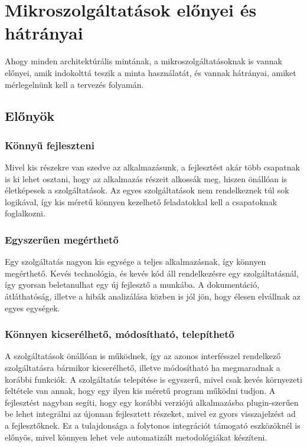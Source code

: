 \documentclass[11pt,magyar,a4paper,twoside,]{report}
\begin{document}
\section{Mikroszolgáltatások előnyei és
hátrányai}\label{mikroszolguxe1ltatuxe1sok-elux151nyei-uxe9s-huxe1truxe1nyai}

Ahogy minden architektúrális mintának, a mikroszolgáltatásoknak is
vannak előnyei\citep{microservices}, amik indokolttá teszik a minta
használatát, és vannak hátrányai\citep{micro-disadv}, amiket
mérlegelnünk kell a tervezés folyamán.

\subsection{Előnyök}\label{elux151nyuxf6k}

\subsubsection{Könnyű fejleszteni}\label{kuxf6nnyux171-fejleszteni}

Mivel kis részekre van szedve az alkalmazásunk, a fejlesztést akár több
csapatnak is ki lehet osztani, hogy az alkalmazás részeit alkossák meg,
hiszen önállóan is életképesek a szolgáltatások. Az egyes szolgáltatások
nem rendelkeznek túl sok logikával, így kis méretű könnyen kezelhető
feladatokkal kell a csapatoknak foglalkozni.

\subsubsection{Egyszerűen
megérthető}\label{egyszerux171en-meguxe9rthetux151}

Egy szolgáltatás nagyon kis egysége a teljes alkalmazásnak, így könnyen
megérthető. Kevés technológia, és kevés kód áll rendelkezésre egy
szolgáltatásnál, így gyorsan beletanulhat egy új fejlesztő a munkába. A
dokumentáció, átláthatóság, illetve a hibák analizálása közben is jól
jön, hogy élesen elvállnak az egyes egységek.

\subsubsection{Könnyen kicserélhető, módosítható,
telepíthető}\label{kuxf6nnyen-kicseruxe9lhetux151-muxf3dosuxedthatuxf3-telepuxedthetux151}

A szolgáltatások önállóan is működnek, így az azonos interfésszel
rendelkező szolgáltatásra bármikor kicserélhető, illetve módosítható ha
megmaradnak a korábbi funkciók. A szolgáltatás telepítése is egyszerű,
mivel csak kevés környezeti feltétele van annak, hogy egy ilyen kis
méretű program működni tudjon. A fejlesztést nagyban segíti, hogy egy
korábbi verziójú alkalmazásba plugin-szerűen be lehet integrálni az
újonnan fejlesztett részeket, mivel ez gyors visszajelzést ad a
fejlesztőknek. Ez a tulajdonsága a folytonos integrációt támogató
eszközöknél is előnyös, mivel könnyen lehet vele automatizált
metodológiákat készíteni.
\end{document}
